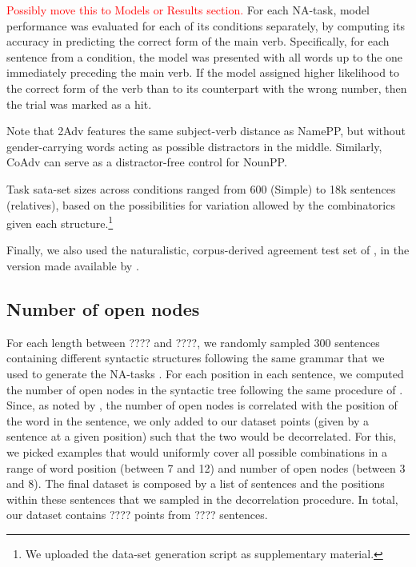 \textcolor{red}{Possibly move this to Models or Results section.} For
each NA-task, model performance was evaluated for each of its
conditions separately, by computing its accuracy in predicting the
correct form of the main verb. Specifically, for each sentence from a
condition, the model was presented with all words up to the one
immediately preceding the main verb. If the model assigned higher
likelihood to the correct form of the verb than to its counterpart
with the wrong number, then the trial was marked as a hit.

 Note that 2Adv features the same subject-verb
distance as NamePP, but without gender-carrying words acting as
possible distractors in the middle. Similarly, CoAdv can serve as a
distractor-free control for NounPP.

Task sata-set sizes across conditions ranged from 600 (Simple) to 18k sentences (relatives),
based on the possibilities for variation allowed by the combinatorics
given each structure.\footnote{We uploaded the data-set generation
  script as supplementary material.}

Finally, we also used the naturalistic, corpus-derived agreement test set of , in the version made available by .

\subsection{Number of open nodes}\label{ssec:n_opennodes}

For each length between ???? and ????, we randomly sampled 300 sentences
containing different syntactic structures following the same grammar that we
used to generate the NA-tasks . For each position in each sentence, we computed
the number of open nodes in the syntactic tree following the same procedure of
. Since, as noted by , the
number of open nodes is correlated with the position of the word in the
sentence, we only added to our dataset points (given by a sentence at a given
position) such that the two would be decorrelated.  For this, we picked
examples that would uniformly cover all possible combinations in a range of
word position (between 7 and 12) and number of open nodes (between 3 and 8).
The final dataset is composed by a list of sentences and the positions
within these sentences that we sampled in the decorrelation procedure. In
total, our dataset contains ???? points from ???? sentences.
